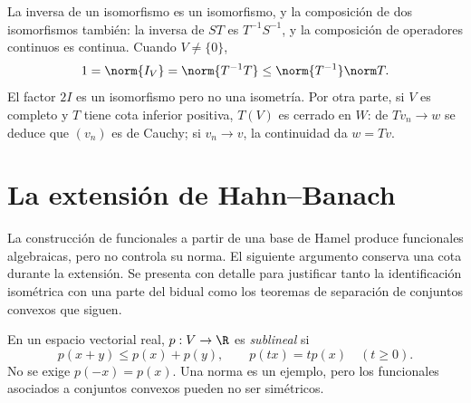 La inversa de un isomorfismo es un isomorfismo, y la composición de dos isomorfismos también: la inversa de $ST$ es $T^{-1}S^{-1}$, y la composición de operadores continuos es continua. Cuando $V\ne\{0\}$,
\[
 1=\norm{I_V}=\norm{T^{-1}T}\leq\norm{T^{-1}}\norm T.
\]
El factor $2I$ es un isomorfismo pero no una isometría. Por otra parte, si $V$ es completo y $T$ tiene cota inferior positiva, $T(V)$ es cerrado en $W$: de $Tv_n\to w$ se deduce que $(v_n)$ es de Cauchy; si $v_n\to v$, la continuidad da $w=Tv$.

\section{La extensión de Hahn--Banach}

La construcción de funcionales a partir de una base de Hamel produce funcionales algebraicas, pero no controla su norma. El siguiente argumento conserva una cota durante la extensión. Se presenta con detalle para justificar tanto la identificación isométrica con una parte del bidual como los teoremas de separación de conjuntos convexos que siguen.

\begin{definicion}
En un espacio vectorial real, $p:V\to\R$ es \emph{sublineal} si
\[
 p(x+y)\leq p(x)+p(y),\qquad p(tx)=tp(x)\quad(t\geq0).
\]
No se exige $p(-x)=p(x)$. Una norma es un ejemplo, pero los funcionales asociados a conjuntos convexos pueden no ser simétricos.
\end{definicion}

